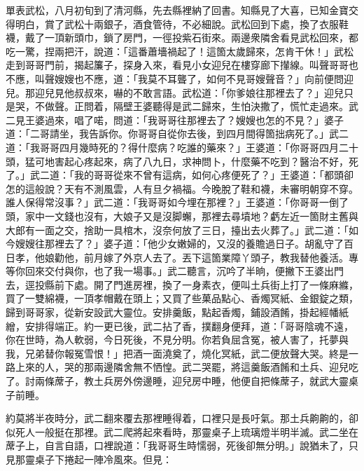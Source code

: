 單表武松，八月初旬到了清河縣，先去縣裡納了回書。知縣見了大喜，已知金寶交得明白，賞了武松十兩銀子，酒食管待，不必細說。武松回到下處，換了衣服鞋襪，戴了一頂新頭巾，鎖了房門，一徑投紫石街來。兩邊衆隣舍看見武松回來，都吃一驚，捏兩把汗，說道：「這番蕭墻禍起了！這箇太歲歸來，怎肯干休！」武松走到哥哥門前，揭起簾子，探身入來，看見小女迎兒在樓穿廊下攆線。叫聲哥哥也不應，叫聲嫂嫂也不應，道：「我莫不耳聾了，如何不見哥嫂聲音？」向前便問迎兒。那迎兒見他叔叔來，嚇的不敢言語。武松道：「你爹娘往那裡去了？」迎兒只是哭，不做聲。{}正問着，隔壁王婆聽得是武二歸來，生怕決撒了，慌忙走過來。武二見王婆過來，唱了喏，問道：「我哥哥往那裡去了？嫂嫂也怎的不見？」婆子道：「二哥請坐，我告訴你。你哥哥自從你去後，到四月間得箇拙病死了。」武二道：「我哥哥四月幾時死的？得什麼病？吃誰的藥來？」王婆道：「你哥哥四月二十頭，猛可地害起心疼起來，病了八九日，求神問卜，什麼藥不吃到？{}醫治不好，死了。」武二道：「我的哥哥從來不曾有這病，如何心疼便死了？」王婆道：「都頭卻怎的這般說？天有不測風雲，人有旦夕禍福。今晚脫了鞋和襪，未審明朝穿不穿。誰人保得常沒事？」{}武二道：「我哥哥如今埋在那裡？」王婆道：「你哥哥一倒了頭，家中一文錢也沒有，大娘子又是沒脚蠏，那裡去尋墳地？虧左近一箇財主舊與大郎有一面之交，捨助一具棺木，沒奈何放了三日，擡出去火葬了。」武二道：「如今嫂嫂往那裡去了？」婆子道：「他少女嫩婦的，又沒的養贍過日子。胡亂守了百日孝，他娘勸他，前月嫁了外京人去了。丟下這箇業障丫頭子，教我替他養活。{}專等你回來交付與你，也了我一場事。」武二聽言，沉吟了半晌，{}便撇下王婆出門去，逕投縣前下處。開了門進房裡，換了一身素衣，便叫土兵街上打了一條麻縧，買了一雙綿襪，一頂孝帽戴在頭上；又買了些菓品點心、香燭冥紙、金銀錠之類，歸到哥哥家，從新安設武大靈位。安排羹飯，點起香燭，鋪設酒餚，掛起經幡紙繒，安排得端正。{}約一更已後，武二拈了香，撲翻身便拜，道：「哥哥陰魂不遠，你在世時，為人軟弱，今日死後，不見分明。你若負屈含冤，被人害了，托夢與我，兄弟替你報冤雪恨！」把酒一面澆奠了，燒化冥紙，武二便放聲大哭。{}終是一路上來的人，哭的那兩邊隣舍無不恓惶。武二哭罷，將這羹飯酒餚和土兵、迎兒吃了。討兩條蓆子，教土兵房外傍邊睡，迎兒房中睡，他便自把條蓆子，就武大靈桌子前睡。

約莫將半夜時分，武二翻來覆去那裡睡得着，口裡只是長吁氣。那土兵齁齁的，卻似死人一般挺在那裡。武二爬將起來看時，那靈桌子上琉璃燈半明半滅。武二坐在蓆子上，自言自語，口裡說道：「我哥哥生時懦弱，死後卻無分明。」說猶未了，只見那靈桌子下捲起一陣冷風來。但見：

